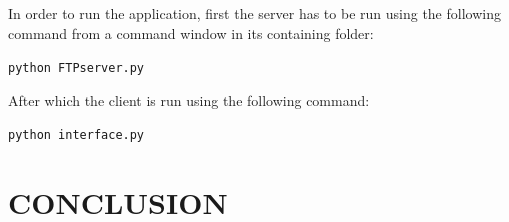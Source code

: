 \documentclass[10pt,twocolumn]{witseiepaper}
\begin{document}
In order to run the application, first the server has to be run using the following command from a command window in its containing folder:

\texttt{python FTPserver.py}

After which the client is run using the following command:

\texttt{python interface.py}


\section{CONCLUSION}


%



\newpage
\onecolumn
\end{document}
